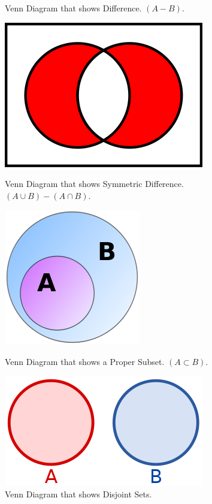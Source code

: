\documentclass[../Latex-Setup/setup.tex]{subfiles}
\begin{document}
\begin{figure}[H]
\begin{minipage}{0.45\textwidth}
        \caption{Venn Diagram that shows Difference. $(A - B)$.}
    \end{minipage}\hfill
    \begin{minipage}{0.45\textwidth}
        \centering
        \includegraphics[scale=0.45]{./images/Venn-Diagram-SymmetricDifference.png}
        \caption{Venn Diagram that shows Symmetric Difference. $(A \cup B) - (A \cap B)$.}
    \end{minipage}\hfill
    \begin{minipage}{0.45\textwidth}
        \centering
        \includegraphics[scale=0.45]{./images/Venn-Diagram-ProperSubset.png}
        \caption{Venn Diagram that shows a Proper Subset. $(A \subset B)$.}
    \end{minipage}\hfill
    \begin{minipage}{0.45\textwidth}
        \centering
        \includegraphics[scale=0.45]{./images/Venn-Diagram-Disjoint.png}
        \caption{Venn Diagram that shows Disjoint Sets.}
    \end{minipage}
\end{figure}
\par
\end{document}
